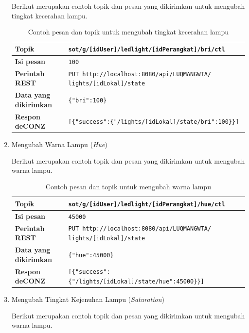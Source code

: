\begin{enumerate}
	Berikut merupakan contoh topik dan pesan yang dikirimkan untuk mengubah tingkat kecerahan lampu.
	
	\begin{table}
		\centering
		\caption{Contoh pesan dan topik untuk mengubah tingkat kecerahan lampu}
		\label{tab:brightnessLampu}
		\begin{tabular}{| l | p{11cm} |}
			\hline
			\textbf{Topik} & \texttt{sot/g/[idUser]/ledlight/[idPerangkat]/bri/ctl} \\
			\hline
			\textbf{Isi pesan} & \texttt{100} \\
			\hline
			\textbf{Perintah REST} & \texttt{PUT http://localhost:8080/api/LUQMANGWTA/ lights/[idLokal]/state} \\
			\hline
			\textbf{Data yang dikirimkan} & \texttt{\{"bri":100\}} \\
			\hline
			\textbf{Respon deCONZ} & \texttt{[\{"success":\{"/lights/[idLokal]/state/bri":100\}\}]} \\
			\hline
		\end{tabular}
	\end{table}
	
	\item Mengubah Warna Lampu (\textit{Hue})
	
	Berikut merupakan contoh topik dan pesan yang dikirimkan untuk mengubah warna lampu.
	
	\begin{table}
		\centering
		\caption{Contoh pesan dan topik untuk mengubah warna lampu}
		\label{tab:hueLampu}
		\begin{tabular}{| l | p{11cm} |}
			\hline
			\textbf{Topik} & \texttt{sot/g/[idUser]/ledlight/[idPerangkat]/hue/ctl} \\
			\hline
			\textbf{Isi pesan} & \texttt{45000} \\
			\hline
			\textbf{Perintah REST} & \texttt{PUT http://localhost:8080/api/LUQMANGWTA/ lights/[idLokal]/state} \\
			\hline
			\textbf{Data yang dikirimkan} & \texttt{\{"hue":45000\}} \\
			\hline
			\textbf{Respon deCONZ} & \texttt{[\{"success":\{"/lights/[idLokal]/state/hue":45000\}\}]} \\
			\hline
		\end{tabular}
	\end{table}
	
	\item Mengubah Tingkat Kejenuhan Lampu (\textit{Saturation})
	
	Berikut merupakan contoh topik dan pesan yang dikirimkan untuk mengubah warna lampu.
	

\end{enumerate}
